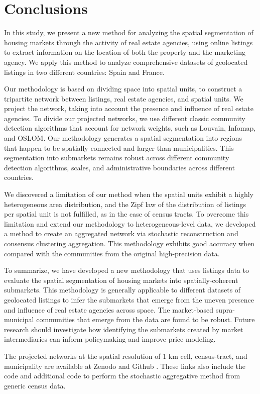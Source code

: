 \section{Conclusions}
\label{sec:conclusions}

In this study, we present a new method for analyzing the spatial segmentation of housing markets through the activity of real estate agencies, using online listings to extract information on the location of both the property and the marketing agency. We apply this method to analyze comprehensive datasets of geolocated listings in two different countries: Spain and France. 

Our methodology is based on dividing space into spatial units, to construct a tripartite network between listings, real estate agencies, and spatial units. We project the network, taking into account the presence and influence of real estate agencies. To divide our projected networks, we use different classic community detection algorithms that account for network weights, such as Louvain, Infomap, and OSLOM. Our methodology generates a spatial segmentation into regions that happen to be spatially connected and larger than municipalities. This segmentation into submarkets remains robust across different community detection algorithms, scales, and administrative boundaries across different countries.

We discovered a limitation of our method when the spatial units exhibit a highly heterogeneous area distribution, and the Zipf law of the distribution of listings per spatial unit is not fulfilled, as in the case of census tracts. To overcome this limitation and extend our methodology to heterogeneous-level data, we developed a method to create an aggregated network via stochastic reconstruction and consensus clustering aggregation. This methodology exhibits good accuracy when compared with the communities from the original high-precision data.

To summarize, we have developed a new methodology that uses listings data to evaluate the spatial segmentation of housing markets into spatially-coherent submarkets. This methodology is generally applicable to different datasets of geolocated listings to infer the submarkets that emerge from the uneven presence and influence of real estate agencies across space. The market-based supra-municipal communities that emerge from the data are found to be robust. Future research should investigate how identifying the submarkets created by market intermediaries can inform policymaking and improve price modeling.

The projected networks at the spatial resolution of $1$ km cell, census-tract, and municipality are available at Zenodo \cite{zenodo-2024} and Github \cite{Abella-github-2024}. These links also include the code and additional code to perform the stochastic aggregative method from generic census data.